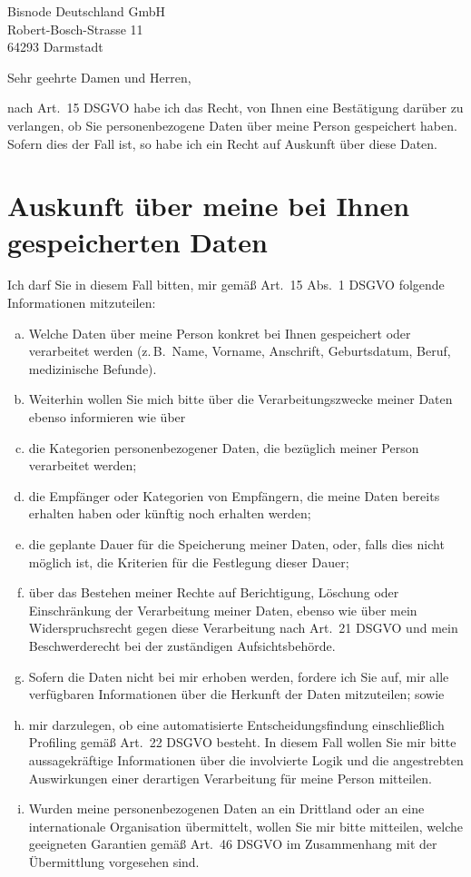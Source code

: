 \documentclass[a4paper,DIV=11]{scrartcl}
\begin{document}
\begin{letter}{%

Bisnode Deutschland GmbH\\
Robert-Bosch-Strasse 11\\
64293 Darmstadt
}
\opening{Sehr geehrte Damen und Herren,}

nach Art.\ 15 DSGVO habe ich das Recht, von Ihnen eine Bestätigung darüber zu verlangen, ob Sie personenbezogene Daten über meine Person gespeichert haben. Sofern dies der Fall ist, so habe ich ein Recht auf Auskunft über diese Daten.

\section{Auskunft über meine bei Ihnen gespeicherten Daten}

Ich darf Sie in diesem Fall bitten, mir gemäß Art.\ 15 Abs.\ 1 DSGVO folgende Informationen mitzuteilen:
\begin{enumerate}[(a)]
\item Welche Daten über meine Person konkret bei Ihnen gespeichert oder verarbeitet werden (z.\,B.\ Name, Vorname, Anschrift, Geburtsdatum, Beruf, medizinische Befunde).
\item Weiterhin wollen Sie mich bitte über die Verarbeitungszwecke meiner Daten ebenso informieren wie über
\item die Kategorien personenbezogener Daten, die bezüglich meiner Person verarbeitet werden;
\item die Empfänger oder Kategorien von Empfängern, die meine Daten bereits erhalten haben oder künftig noch erhalten werden;
\item die geplante Dauer für die Speicherung meiner Daten, oder, falls dies nicht möglich ist, die Kriterien für die Festlegung dieser Dauer;
\item über das Bestehen meiner Rechte auf Berichtigung, Löschung oder Einschränkung der Verarbeitung meiner Daten, ebenso wie über mein Widerspruchsrecht gegen diese Verarbeitung nach Art.\ 21 DSGVO und mein Beschwerderecht bei der zuständigen Aufsichtsbehörde.
\item Sofern die Daten nicht bei mir erhoben werden, fordere ich Sie auf, mir alle verfügbaren Informationen über die Herkunft der Daten mitzuteilen; sowie
\item mir darzulegen, ob eine automatisierte Entscheidungsfindung einschließlich Profiling gemäß Art.\ 22 DSGVO besteht. In diesem Fall wollen Sie mir bitte aussagekräftige Informationen über die involvierte Logik und die angestrebten Auswirkungen einer derartigen Verarbeitung für meine Person mitteilen.
\item Wurden meine personenbezogenen Daten an ein Drittland oder an eine internationale Organisation übermittelt, wollen Sie mir bitte mitteilen, welche geeigneten Garantien gemäß Art.\ 46 DSGVO im Zusammenhang mit der Übermittlung vorgesehen sind.
\end{enumerate}


\end{letter}
\end{document}
